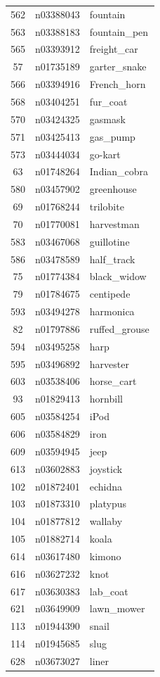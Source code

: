 \begin{table}
\begin{tabular}{cll}
562 & n03388043 & fountain \\
563 & n03388183 & fountain_pen \\
565 & n03393912 & freight_car \\
57 & n01735189 & garter_snake \\
566 & n03394916 & French_horn \\
568 & n03404251 & fur_coat \\
570 & n03424325 & gasmask \\
571 & n03425413 & gas_pump \\
573 & n03444034 & go-kart \\
63 & n01748264 & Indian_cobra \\
580 & n03457902 & greenhouse \\
69 & n01768244 & trilobite \\
70 & n01770081 & harvestman \\
583 & n03467068 & guillotine \\
586 & n03478589 & half_track \\
75 & n01774384 & black_widow \\
79 & n01784675 & centipede \\
593 & n03494278 & harmonica \\
82 & n01797886 & ruffed_grouse \\
594 & n03495258 & harp \\
595 & n03496892 & harvester \\
603 & n03538406 & horse_cart \\
93 & n01829413 & hornbill \\
605 & n03584254 & iPod \\
606 & n03584829 & iron \\
609 & n03594945 & jeep \\
613 & n03602883 & joystick \\
102 & n01872401 & echidna \\
103 & n01873310 & platypus \\
104 & n01877812 & wallaby \\
105 & n01882714 & koala \\
614 & n03617480 & kimono \\
616 & n03627232 & knot \\
617 & n03630383 & lab_coat \\
621 & n03649909 & lawn_mower \\
113 & n01944390 & snail \\
114 & n01945685 & slug \\
628 & n03673027 & liner \\

\end{tabular}
\end{table}
